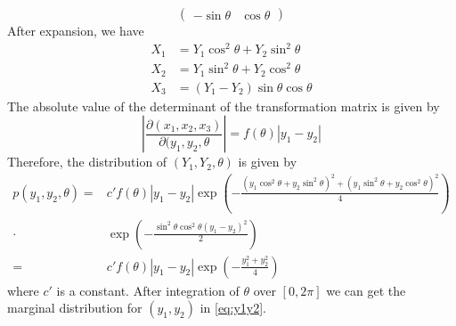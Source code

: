 \documentclass{article}
\begin{document}
\begin{enumerate}
$$\begin{pmatrix}
-\sin\theta & \cos\theta
\end{pmatrix}
$$
After expansion, we have
\begin{align*}
    X_1 & = Y_1 \cos^2\theta + Y_2\sin^2\theta  \\
    X_2 & = Y_1 \sin^2\theta + Y_2\cos^2\theta  \\
    X_3 & = (Y_1 - Y_2)\sin \theta \cos \theta 
\end{align*}
The absolute value of the determinant of the transformation matrix is given by
$$
|\frac{\partial (x_1, x_2, x_3)}{\partial (y_1, y_2, \theta}| = f(\theta)|y_1 - y_2|
$$
Therefore, the distribution of $(Y_1, Y_2, \theta)$
is given by 
\begin{align*}
p(y_1, y_2, \theta) =& c'f(\theta)|y_1-y_2|\exp(-\frac{( y_1\cos^2\theta +y_2 \sin^2\theta )^2+( y_1\sin^2\theta + y_2\cos^2\theta )^2}{4})\\
\cdot & \exp(-\frac{\sin^2\theta\cos^2\theta (y_1-y_2)^2}{2}) \\
=&c'f(\theta)|y_1-y_2|\exp(-\frac{y_1^2+y_2^2}{4})
\end{align*}
where $c'$ is a constant.
After integration of $\theta$ over $[0, 2\pi]$ we can get the marginal distribution
for $(y_1, y_2)$ in \eqref{eq:y1y2}.
\end{enumerate}
\end{document}
